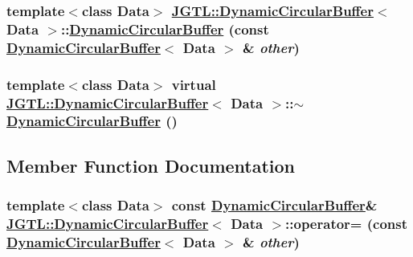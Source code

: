 \hypertarget{class_j_g_t_l_1_1_dynamic_circular_buffer_dff0297e4ca67ed7f7a9078579b2cc3f}{
\subsubsection[DynamicCircularBuffer]{\setlength{\rightskip}{0pt plus 5cm}template$<$class Data$>$ \hyperlink{class_j_g_t_l_1_1_dynamic_circular_buffer}{JGTL::Dynamic\-Circular\-Buffer}$<$ Data $>$::\hyperlink{class_j_g_t_l_1_1_dynamic_circular_buffer}{Dynamic\-Circular\-Buffer} (const \hyperlink{class_j_g_t_l_1_1_dynamic_circular_buffer}{Dynamic\-Circular\-Buffer}$<$ Data $>$ \& {\em other})}}
\label{class_j_g_t_l_1_1_dynamic_circular_buffer_dff0297e4ca67ed7f7a9078579b2cc3f}


\hypertarget{class_j_g_t_l_1_1_dynamic_circular_buffer_128034b920124c7f5d6d9e5da0e2050f}{
\subsubsection[$\sim$DynamicCircularBuffer]{\setlength{\rightskip}{0pt plus 5cm}template$<$class Data$>$ virtual \hyperlink{class_j_g_t_l_1_1_dynamic_circular_buffer}{JGTL::Dynamic\-Circular\-Buffer}$<$ Data $>$::$\sim$\hyperlink{class_j_g_t_l_1_1_dynamic_circular_buffer}{Dynamic\-Circular\-Buffer} ()}}
\label{class_j_g_t_l_1_1_dynamic_circular_buffer_128034b920124c7f5d6d9e5da0e2050f}




\subsection{Member Function Documentation}
\hypertarget{class_j_g_t_l_1_1_dynamic_circular_buffer_9a409b912e902f65ae09babd635b8d6e}{
\subsubsection[operator=]{\setlength{\rightskip}{0pt plus 5cm}template$<$class Data$>$ const \hyperlink{class_j_g_t_l_1_1_dynamic_circular_buffer}{Dynamic\-Circular\-Buffer}\& \hyperlink{class_j_g_t_l_1_1_dynamic_circular_buffer}{JGTL::Dynamic\-Circular\-Buffer}$<$ Data $>$::operator= (const \hyperlink{class_j_g_t_l_1_1_dynamic_circular_buffer}{Dynamic\-Circular\-Buffer}$<$ Data $>$ \& {\em other})}}
\label{class_j_g_t_l_1_1_dynamic_circular_buffer_9a409b912e902f65ae09babd635b8d6e}


